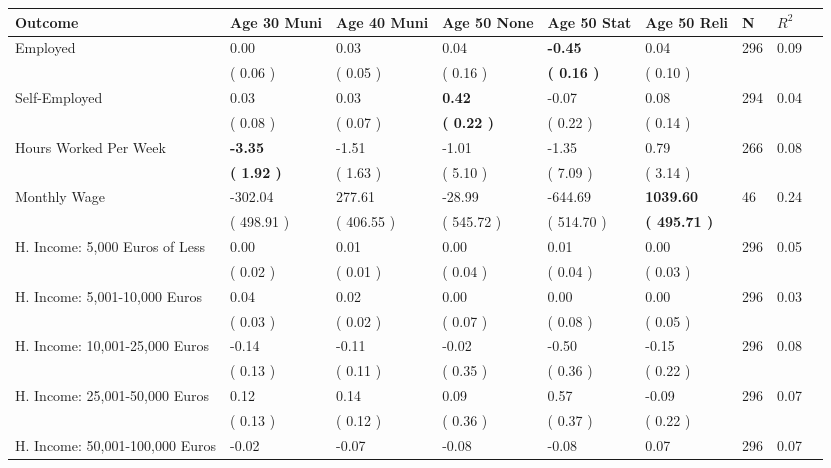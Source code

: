 \begin{tabular}{L{6.2cm} C{1.8cm} C{1.8cm} C{1.8cm} C{1.8cm} C{1.8cm} C{1.8cm} C{0.3cm} C{0.3cm}}
\toprule
 \textbf{Outcome} & \textbf{Age 30 Muni} & \textbf{Age 40 Muni} & \textbf{Age 50 None} & \textbf{Age 50 Stat} & \textbf{Age 50 Reli} & \textbf{N} & \textbf{$ R^2$} \\
\midrule
Employed &      0.00 &      0.03 &      0.04 & \textbf{    -0.45} &      0.04  & 296 &       0.09 \\ 
 & (     0.06 ) & (     0.05 ) & (     0.16 ) & \textbf{(     0.16 )} & (     0.10 )  & \\
Self-Employed &      0.03 &      0.03 & \textbf{     0.42} &     -0.07 &      0.08  & 294 &       0.04 \\ 
 & (     0.08 ) & (     0.07 ) & \textbf{(     0.22 )} & (     0.22 ) & (     0.14 )  & \\
Hours Worked Per Week & \textbf{    -3.35} &     -1.51 &     -1.01 &     -1.35 &      0.79  & 266 &       0.08 \\ 
 & \textbf{(     1.92 )} & (     1.63 ) & (     5.10 ) & (     7.09 ) & (     3.14 )  & \\
Monthly Wage &   -302.04 &    277.61 &    -28.99 &   -644.69 & \textbf{  1039.60}  & 46 &       0.24 \\ 
 & (   498.91 ) & (   406.55 ) & (   545.72 ) & (   514.70 ) & \textbf{(   495.71 )}  & \\
H. Income: 5,000 Euros of Less &      0.00 &      0.01 &      0.00 &      0.01 &      0.00  & 296 &       0.05 \\ 
 & (     0.02 ) & (     0.01 ) & (     0.04 ) & (     0.04 ) & (     0.03 )  & \\
H. Income: 5,001-10,000 Euros &      0.04 &      0.02 &      0.00 &      0.00 &      0.00  & 296 &       0.03 \\ 
 & (     0.03 ) & (     0.02 ) & (     0.07 ) & (     0.08 ) & (     0.05 )  & \\
H. Income: 10,001-25,000 Euros &     -0.14 &     -0.11 &     -0.02 &     -0.50 &     -0.15  & 296 &       0.08 \\ 
 & (     0.13 ) & (     0.11 ) & (     0.35 ) & (     0.36 ) & (     0.22 )  & \\
H. Income: 25,001-50,000 Euros &      0.12 &      0.14 &      0.09 &      0.57 &     -0.09  & 296 &       0.07 \\ 
 & (     0.13 ) & (     0.12 ) & (     0.36 ) & (     0.37 ) & (     0.22 )  & \\
H. Income: 50,001-100,000 Euros &     -0.02 &     -0.07 &     -0.08 &     -0.08 &      0.07  & 296 &       0.07 \\ 

\end{tabular}
